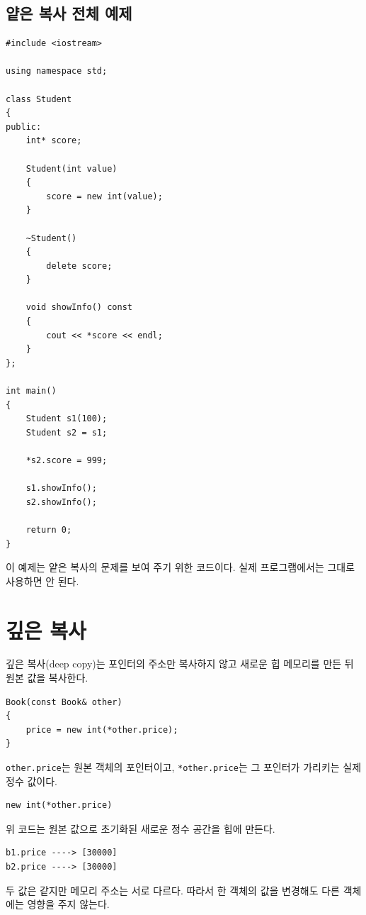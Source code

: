 \documentclass[11pt,a4paper]{article}
\begin{document}
\subsection{얕은 복사 전체 예제}
\begin{lstlisting}
#include <iostream>

using namespace std;

class Student
{
public:
    int* score;

    Student(int value)
    {
        score = new int(value);
    }

    ~Student()
    {
        delete score;
    }

    void showInfo() const
    {
        cout << *score << endl;
    }
};

int main()
{
    Student s1(100);
    Student s2 = s1;

    *s2.score = 999;

    s1.showInfo();
    s2.showInfo();

    return 0;
}
\end{lstlisting}

이 예제는 얕은 복사의 문제를 보여 주기 위한 코드이다. 실제 프로그램에서는 그대로 사용하면 안 된다.

\section{깊은 복사}
깊은 복사(deep copy)는 포인터의 주소만 복사하지 않고 새로운 힙 메모리를 만든 뒤 원본 값을 복사한다.

\begin{lstlisting}
Book(const Book& other)
{
    price = new int(*other.price);
}
\end{lstlisting}

\texttt{other.price}는 원본 객체의 포인터이고, \texttt{*other.price}는 그 포인터가 가리키는 실제 정수 값이다.

\begin{lstlisting}
new int(*other.price)
\end{lstlisting}

위 코드는 원본 값으로 초기화된 새로운 정수 공간을 힙에 만든다.

\begin{verbatim}
b1.price ----> [30000]
b2.price ----> [30000]
\end{verbatim}

두 값은 같지만 메모리 주소는 서로 다르다. 따라서 한 객체의 값을 변경해도 다른 객체에는 영향을 주지 않는다.
\end{document}
